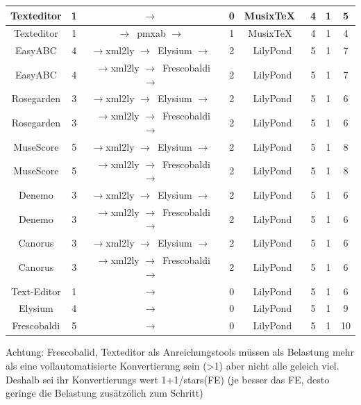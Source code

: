 \documentclass[
  DIV=calc,
  BCOR=5mm,
  11pt,
  headings=small,
  oneside,
  abstract=true,
  toc=bib,
  xcolor=dvipsnames,
  english,ngerman]{scrartcl}
\newcommand{\ra}[0]{$\rightarrow$}
\begin{document}
\begin{small}
\begin{ThreePartTable}
\begin{longtable}{|c|c|c|c|c|c||c||c||}
\hline
Texteditor & 1 & \ra\ & 0 &  Musix\TeX\ & 4 & 1 & 5 \\
\hline
Texteditor & 1 & \ra\ pmxab \ra\ & 1 &  Musix\TeX\ & 4 & 1 & 4 \\
\hline
\hline
 Easy\-ABC & 4 & \ra xml2ly \ra\ Elysium \ra\ & 2 & LilyPond & 5 & 1 & 7 \\
\hline
 Easy\-ABC & 4 & \ra xml2ly \ra\ Frescobaldi \ra\ & 2 & LilyPond & 5 & 1 & 7 \\
\hline
 Rosegarden & 3 & \ra xml2ly \ra\ Elysium \ra\ & 2 & LilyPond & 5 & 1 & 6 \\
\hline
 Rosegarden & 3 & \ra xml2ly \ra\ Frescobaldi \ra\ & 2 & LilyPond & 5 & 1 & 6 \\
\hline
 MuseScore & 5 & \ra xml2ly \ra\ Elysium \ra\ & 2 & LilyPond & 5 & 1 & 8 \\
\hline
 MuseScore & 5 & \ra xml2ly \ra\ Frescobaldi \ra\ & 2 & LilyPond & 5 & 1 & 8 \\
\hline
Denemo & 3 & \ra xml2ly \ra\ Elysium \ra\ & 2 & LilyPond & 5 & 1 & 6 \\
\hline
Denemo & 3 & \ra xml2ly \ra\ Frescobaldi \ra\ & 2 & LilyPond & 5 & 1 & 6 \\
\hline
Canorus & 3 & \ra xml2ly \ra\ Elysium \ra\ & 2 & LilyPond & 5 & 1 & 6 \\
\hline
Canorus & 3 & \ra xml2ly \ra\ Frescobaldi \ra\ & 2 & LilyPond & 5 & 1 & 6 \\
\hline
\hline
 Text-Editor & 1 & \ra\ & 0 &  LilyPond & 5 & 1 & 6 \\
\hline
 Elysium & 4 & \ra\ & 0 &  LilyPond & 5 & 1 & 9 \\
\hline
 Frescobaldi & 5 & \ra\ & 0 &  LilyPond & 5 & 1 & 10 \\
\hline
\hline
\end{longtable}
\end{ThreePartTable}
\end{small}

Achtung: Frescobalid, Texteditor als Anreichungstools müssen als Belastung mehr als
eine vollautomatisierte Konvertierung sein (>1) aber nicht alle geleich viel.
Deshalb sei  ihr Konvertierungs wert 1+1/stars(FE) (je besser das FE, desto geringe die Belastung zusätzölich zum Schritt)
\end{document}
